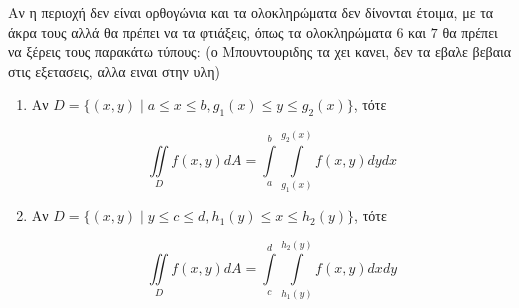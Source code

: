 \documentclass[a4paper,12pt]{article}
\begin{document}
\begin{center}
\end{center}

\vspace{\baselineskip}

Αν η περιοχή δεν είναι ορθογώνια και τα ολοκληρώματα δεν δίνονται έτοιμα, με τα άκρα τους αλλά θα πρέπει να τα φτιάξεις, όπως τα ολοκληρώματα $6$ και $7$ θα πρέπει να ξέρεις τους παρακάτω τύπους: (ο Μπουντουριδης τα χει κανει, δεν τα εβαλε βεβαια στις εξετασεις, αλλα ειναι στην υλη) 

\begin{enumerate}

\item 
Αν $D = \{(x,y)\mid a\leq x\leq b, g_1(x)\leq y \leq g_2(x)\}$, τότε

\[
\iint\limits_D f(x,y)dA = \int\limits_{a}^{b}\int\limits_{g_1(x)}^{g_2(x)}f(x,y)dydx 
\]

\item 
Αν $D = \{(x,y)\mid y\leq c\leq d, h_1(y)\leq x \leq h_2(y)\}$, τότε

\[
\iint\limits_D f(x,y)dA = \int\limits_{c}^{d}\int\limits_{h_1(y)}^{h_2(y)}f(x,y)dxdy 
\]
\end{enumerate}
\end{document}
